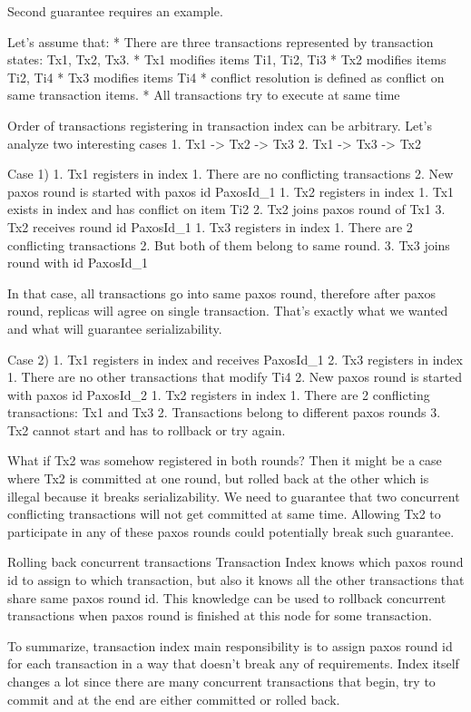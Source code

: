 Second guarantee requires an example.


Let’s assume that:
* There are three transactions represented by transaction states: Tx1, Tx2, Tx3.
* Tx1 modifies items Ti1, Ti2, Ti3
* Tx2 modifies items Ti2, Ti4
* Tx3 modifies items Ti4
* conflict resolution is defined as conflict on same transaction items.
* All transactions try to execute at same time


Order of transactions registering in transaction index can be arbitrary. Let’s analyze two interesting cases
1. Tx1 -> Tx2 -> Tx3
2. Tx1 -> Tx3 -> Tx2


Case 1)
1. Tx1 registers in index
   1. There are no conflicting transactions
   2. New paxos round is started with paxos id PaxosId_1
1. Tx2 registers in index
   1. Tx1 exists in index and has conflict on item Ti2
   2. Tx2 joins paxos round of Tx1 
   3. Tx2 receives round id PaxosId_1
1. Tx3 registers in index
   1. There are 2 conflicting transactions
   2. But both of them belong to same round. 
   3. Tx3 joins round with id PaxosId_1


In that case, all transactions go into same paxos round, therefore after paxos round, replicas will agree on single transaction. That’s exactly what we wanted and what will guarantee serializability.


Case 2)
1. Tx1 registers in index and receives PaxosId_1
2. Tx3 registers in index
   1. There are no other transactions that modify Ti4
   2. New paxos round is started with paxos id PaxosId_2
1. Tx2 registers in index
   1. There are 2 conflicting transactions: Tx1 and Tx3
   2. Transactions belong to different paxos rounds
   3. Tx2 cannot start and has to rollback or try again.


What if Tx2 was somehow registered in both rounds? Then it might be a case where Tx2 is committed at one round, but rolled back at the other which is illegal because it breaks serializability. We need to guarantee that two concurrent conflicting transactions will not get committed at same time. Allowing Tx2 to participate in any of these paxos rounds could potentially break such guarantee.


Rolling back concurrent transactions
Transaction Index knows which paxos round id to assign to which transaction, but also it knows all the other transactions that share same paxos round id. This knowledge can be used to rollback concurrent transactions when paxos round is finished at this node for some transaction.


To summarize, transaction index main responsibility is to assign paxos round id for each transaction in a way that doesn’t break any of requirements. Index itself changes a lot since there are many concurrent transactions that begin, try to commit and at the end are either committed or rolled back. 





